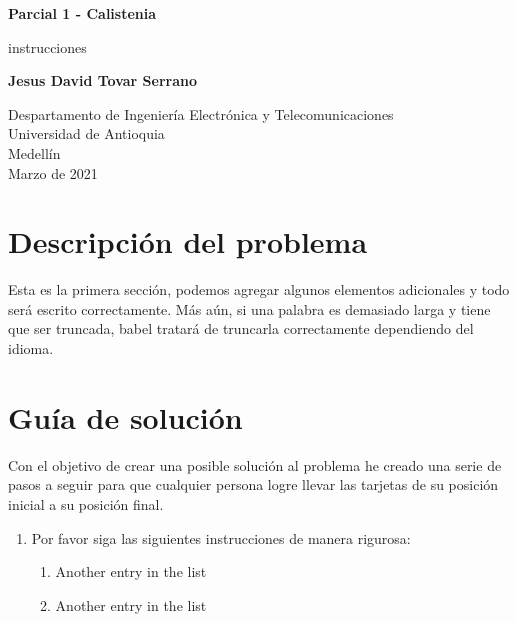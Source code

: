 \documentclass{article}
\begin{document}
\begin{titlepage}
    \begin{center}
        \vspace*{1cm}
            
        \Huge
        \textbf{Parcial 1 - Calistenia}
            
        \vspace{0.5cm}
        \LARGE
        instrucciones
            
        \vspace{1.5cm}
            
        \textbf{Jesus David Tovar Serrano}
            
        \vfill
            
        \vspace{0.8cm}
            
        \Large
        Despartamento de Ingeniería Electrónica y Telecomunicaciones\\
        Universidad de Antioquia\\
        Medellín\\
        Marzo de 2021
            
    \end{center}
\end{titlepage}

\tableofcontents
\newpage
\section{Descripción del problema}\label{intro}
Esta es la primera sección, podemos agregar algunos elementos adicionales y todo será escrito correctamente. Más aún, si una palabra es demasiado larga y tiene que ser truncada, babel tratará de truncarla correctamente dependiendo del idioma.

\section{Guía de solución} \label{contenido}
Con el objetivo de crear una posible solución al problema he creado una serie de pasos a seguir para que cualquier persona logre llevar las tarjetas de su posición inicial a su posición final.

\begin{enumerate}
  \item Por favor siga las siguientes instrucciones de manera rigurosa:
  \begin{enumerate}
  \item Another entry in the list
  \item Another entry in the list
\end{enumerate}
\end{enumerate}
\end{document}
